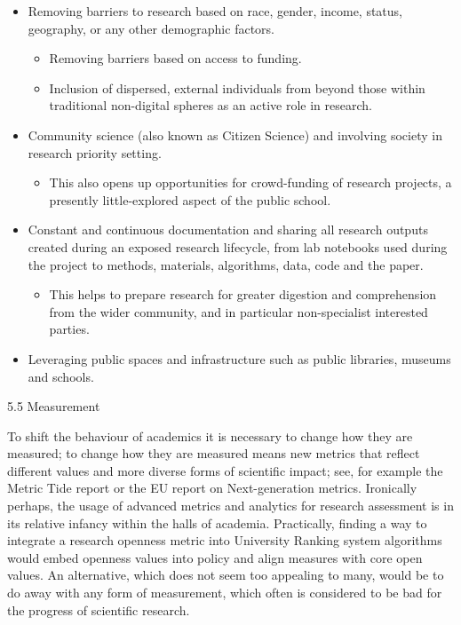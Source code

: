 \documentclass[]{article}
\providecommand{\tightlist}{%
  \setlength{\itemsep}{0pt}\setlength{\parskip}{0pt}}
\begin{document}
\begin{itemize}
\item
  Removing barriers to research based on race, gender, income, status,
  geography, or any other demographic factors.

  \begin{itemize}
  \item
    Removing barriers based on access to funding.
  \item
    Inclusion of dispersed, external individuals from beyond those
    within traditional non-digital spheres as an active role in
    research.
  \end{itemize}
\item
  Community science (also known as Citizen Science) and involving
  society in research priority setting.

  \begin{itemize}
  \tightlist
  \item
    This also opens up opportunities for crowd-funding of research
    projects, a presently little-explored aspect of the public school.
  \end{itemize}
\item
  Constant and continuous documentation and sharing all research outputs
  created during an exposed research lifecycle, from lab notebooks used
  during the project to methods, materials, algorithms, data, code and
  the paper.

  \begin{itemize}
  \tightlist
  \item
    This helps to prepare research for greater digestion and
    comprehension from the wider community, and in particular
    non-specialist interested parties.
  \end{itemize}
\item
  Leveraging public spaces and infrastructure such as public libraries,
  museums and schools.
\end{itemize}

5.5 Measurement

To shift the behaviour of academics it is necessary to change how they
are measured; to change how they are measured means new metrics that
reflect different values and more diverse forms of scientific impact;
see, for example the Metric Tide report or the EU report on
Next-generation metrics. Ironically perhaps, the usage of advanced
metrics and analytics for research assessment is in its relative infancy
within the halls of academia. Practically, finding a way to integrate a
research openness metric into University Ranking system algorithms would
embed openness values into policy and align measures with core open
values. An alternative, which does not seem too appealing to many, would
be to do away with any form of measurement, which often is considered to
be bad for the progress of scientific research.
\end{document}
